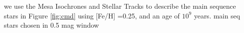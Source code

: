 \documentclass[preprint2]{aastex62}
\newcommand{\Kepler}{\textsl{Kepler}\xspace}
\begin{document}
we use the Mesa Isochrones and Stellar Tracks \citep[MIST;][]{MIST} to describe the main sequence stars in Figure \ref{fig:cmd} using [Fe/H] =0.25, and an age of $10^9$ years.
main seq stars chosen in 0.5 mag window





%
%
%
\end{document}
